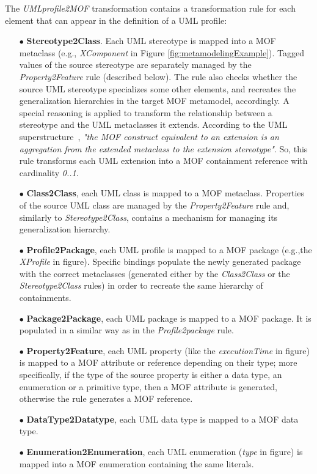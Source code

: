 %
The \textit{UMLprofile2MOF} transformation contains a transformation rule for each element that can appear in the definition of a UML profile:
\begin{itemize}
	\item[$\bullet$] \textbf{Stereotype2Class}. Each UML stereotype is mapped into a MOF metaclass
	(e.g., \textit{XComponent} in Figure \ref{fig:metamodelingExample}).  		
	Tagged values of the source stereotype are separately managed by the \textit{Property2Feature} rule (described below).
	The rule also checks whether the source UML stereotype specializes some other elements, and recreates the generalization hierarchies in the target MOF metamodel, accordingly.
	A special reasoning is applied to transform the relationship between a stereotype and the UML metaclasses it extends.
	According to the UML superstructure~\cite{UML}, \textit{"the MOF construct equivalent to an extension is an aggregation from
	the extended metaclass to the extension stereotype"}. So, this rule transforms each UML extension into
	a MOF containment reference with cardinality \textit{0..1}. 	
	\item[$\bullet$] \textbf{Class2Class}, each UML class is mapped to a MOF metaclass.
	Properties of the source UML class are managed by the \textit{Property2Feature} rule and, similarly to \textit{Stereotype2Class},
	contains a mechanism for managing its generalization hierarchy.
	\item[$\bullet$] \textbf{Profile2Package}, each UML profile is mapped to a MOF package (e.g.,the \textit{ XProfile} in figure). Specific bindings populate the newly generated package with the correct metaclasses (generated either by the \textit{Class2Class} or the \textit{Stereotype2Class} rules) in order to recreate the same hierarchy of containments.
	\item[$\bullet$] \textbf{Package2Package}, each UML package is mapped to a MOF package. It is populated in a similar way as in the \textit{Profile2package} rule.
	\item[$\bullet$] \textbf{Property2Feature}, each UML property (like the \textit{executionTime} in figure)
	is mapped to a MOF attribute or reference depending on their type;
	more specifically, if the type of the source property is either a data type, an enumeration or a primitive type,
	then a MOF attribute is generated, otherwise the rule generates a MOF reference.
	\item[$\bullet$] \textbf{DataType2Datatype}, each UML data type is mapped to a MOF data type.
	\item[$\bullet$] \textbf{Enumeration2Enumeration}, each UML enumeration (\textit{type} in figure)
	is mapped into a MOF enumeration containing the same literals.
\end{itemize}
